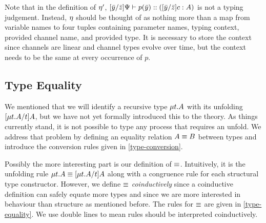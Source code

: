 
Note that in the definition of $\eta'$, $\lbrack{\bar{y}}/{\bar{z}}\rbrack{\Psi} \vdash {p}(\bar{y}) :: (\lbrack{\bar{y}}/{\bar{z}}\rbrack{c} : A)$ is not a typing judgement. Instead, $\eta$ should be thought of as nothing more than a map from variable names to four tuples containing parameter names, typing context, provided channel name, and provided type. It is necessary to store the context since channels are linear and channel types evolve over time, but the context needs to be the same at every occurrence of $p$.


\subsection{Type Equality}
\label{base:type-equality}

We mentioned that we will identify a recursive type $\mu{t} . {A}$ with its unfolding $\lbrack{\mu{t} . {A}}/{t}\rbrack{A}$, but we have not yet formally introduced this to the theory. As things currently stand, it is not possible to type any process that requires an unfold. We address that problem by defining an equality relation $A \equiv B$ between types and introduce the conversion rules given in \cref{type-conversion}.


Possibly the more interesting part is our definition of $\equiv$. Intuitively, it is the unfolding rule $\mu{t} . {A} \equiv \lbrack{\mu{t} . {A}}/{t}\rbrack{A}$ along with a congruence rule for each structural type constructor. However, we define $\equiv$ \emph{coinductively} since a coinductive definition can safely equate more types \cite{StoneS2005} and since we are more interested in behaviour than structure as mentioned before. The rules for $\equiv$ are given in \cref{type-equality}. We use double lines to mean rules should be interpreted coinductively.

